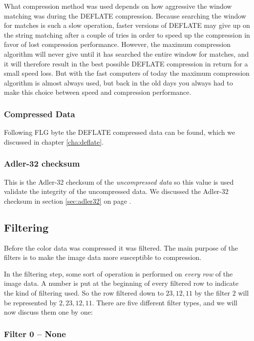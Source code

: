 What compression method was used depends on how aggressive the \lzone
window matching was during the DEFLATE compression. Because searching
the \lzone window for matches is such a slow operation, faster versions
of DEFLATE may give up on the string matching after a couple of tries
in order to speed up the compression in favor of lost compression
performance. However, the maximum compression algorithm will never
give until it has searched the entire window for matches, and it will
therefore result in the best possible DEFLATE compression in return
for a small speed loss. But with the fast computers of today the
maximum compression algorithm is almost always used, but back in the
old days you always had to make this choice between speed and
compression performance.

\subsubsection{Compressed Data}

Following FLG byte the DEFLATE compressed data can be found, which we
discussed in chapter \ref{cha:deflate}.

\subsubsection{Adler-32 checksum}

This is the Adler-32 checksum of the \textit{uncompressed data} so
this value is used validate the integrity of the uncompressed data. We
discussed the Adler-32 checksum in section \ref{sec:adler32} on page
\pageref{sec:adler32}.

\subsection{Filtering}
\label{sec:png-filters}

Before the color data was compressed it was filtered. The main purpose
of the filters is to make the image data more susceptible to
compression.

In the filtering step, some sort of operation is performed on
\textit{every row} of the image data. A number is put at the beginning
of every filtered row to indicate the kind of filtering used. So the
row filtered down to $23,12,11$ by the filter $2$ will be represented
by $2, 23,12,11$. There are five different filter types, and we will
now discuss them one by one:

\subsubsection{Filter 0 -- None}

